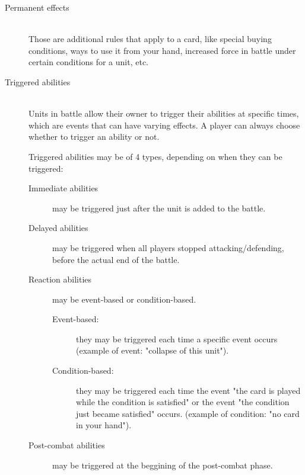 \documentclass[a4paper]{article}
\begin{document}
    \begin{description}
        \item[Permanent effects] \hfill \\
        	Those are additional rules that apply to a card,
            like special buying conditions, ways to use it from your hand, 
            increased force in battle under certain conditions for a unit, etc.
        \item[Triggered abilities] \hfill \\
            Units in battle allow their owner to trigger their abilities at
            specific times, which are events that can have varying effects.
            A player can always choose whether to trigger an ability or not.
            
            Triggered abilities may be of 4 types,
            depending on when they can be triggered:
            \begin{description}
        	        \item[Immediate abilities]
                    	may be triggered just after the unit is added to the battle.
        	        \item[Delayed abilities]
                    may be triggered when all players stopped attacking/defending,
	                before the actual end of the battle.
        	        \item[Reaction abilities] may be event-based or condition-based.
	                \begin{description}
                        \item[Event-based:]
                        they may be triggered each time a specific event occurs
                        (example of event: "collapse of this unit").
                        \item[Condition-based:]
                        they may be triggered each time the event
                        "the card is played while the condition is satisfied" or the
                        event "the condition just became satisfied" occurs.
                        (example of condition: "no card in your hand").
                    \end{description}
        	        \item[Post-combat abilities] may be triggered at the beggining of the
                    post-combat phase.
            \end{description}
    \end{description}
    
\end{document}
